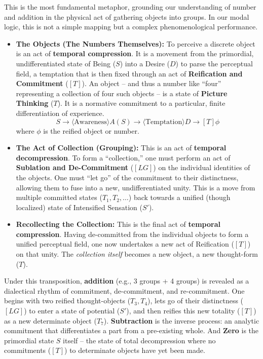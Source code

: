 \documentclass[12pt]{book}
\begin{document}
This is the most fundamental metaphor, grounding our understanding of number and addition in the physical act of gathering objects into groups. In our modal logic, this is not a simple mapping but a complex phenomenological performance.

\begin{itemize}
 \item \textbf{The Objects (The Numbers Themselves):} To perceive a discrete object is an act of \textbf{temporal compression}. It is a movement from the primordial, undifferentiated state of Being ($S$) into a Desire ($D$) to parse the perceptual field, a temptation that is then fixed through an act of \textbf{Reification and Commitment} ($[T]$). An object -- and thus a number like ``four'' representing a collection of four such objects -- is a state of \textbf{Picture Thinking} ($T$). It is a normative commitment to a particular, finite differentiation of experience.
 \[ S \rightarrow \langle \text{Awareness} \rangle A(S) \rightarrow \langle \text{Temptation} \rangle D \rightarrow [T]\phi \]
 where $\phi$ is the reified object or number.

 \item \textbf{The Act of Collection (Grouping):} This is an act of \textbf{temporal decompression}. To form a ``collection,'' one must perform an act of \textbf{Sublation and De-Commitment} ($[LG]$) on the individual identities of the objects. One must ``let go'' of the commitment to their distinctness, allowing them to fuse into a new, undifferentiated unity. This is a move from multiple committed states ($T_1, T_2, \dots$) back towards a unified (though localized) state of Intensified Sensation ($S'$).

 \item \textbf{Recollecting the Collection:} This is the final act of \textbf{temporal compression}. Having de-committed from the individual objects to form a unified perceptual field, one now undertakes a new act of Reification ($[T]$) on that unity. The \textit{collection itself} becomes a new object, a new thought-form ($T$).
\end{itemize}

Under this transposition, \textbf{addition} (e.g., 3 groups + 4 groups) is revealed as a dialectical rhythm of commitment, de-commitment, and re-commitment. One begins with two reified thought-objects ($T_3, T_4$), lets go of their distinctness ($[LG]$) to enter a state of potential ($S'$), and then reifies this new totality ($[T]$) as a new determinate object ($T_7$). \textbf{Subtraction} is the inverse process: an analytic commitment that differentiates a part from a pre-existing whole. And \textbf{Zero} is the primordial state $S$ itself -- the state of total decompression where no commitments ($[T]$) to determinate objects have yet been made.
\end{document}

